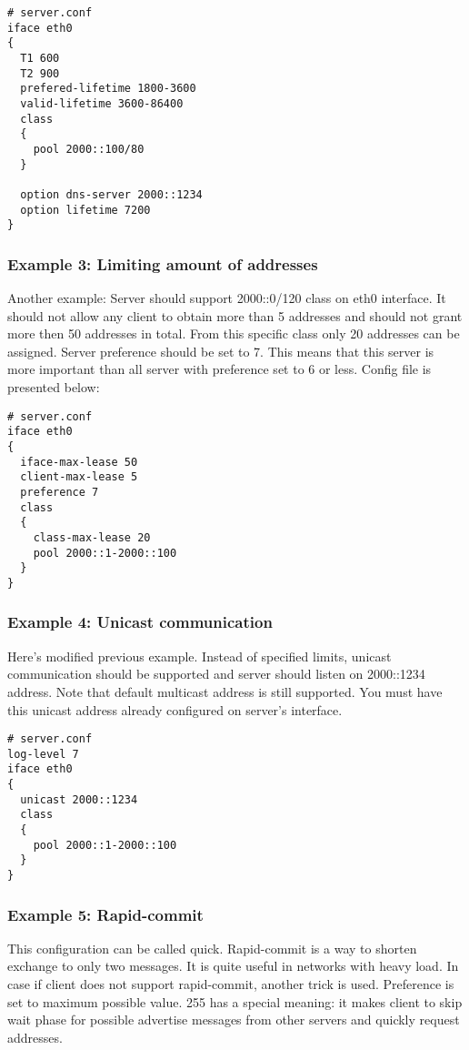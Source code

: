 \begin{lstlisting}
# server.conf
iface eth0
{
  T1 600
  T2 900
  prefered-lifetime 1800-3600
  valid-lifetime 3600-86400
  class
  {
    pool 2000::100/80
  }

  option dns-server 2000::1234
  option lifetime 7200
}
\end{lstlisting}

\subsubsection{Example 3: Limiting amount of addresses}
Another example: Server should support 2000::0/120 class on eth0
interface. It should not allow any client to obtain more than 5
addresses and should not grant more then 50 addresses in total. From
this specific class only 20 addresses can be assigned. Server
preference should be set to 7. This means that this server is more
important than all server with preference set to 6 or less.
Config file is presented below:

\begin{lstlisting}
# server.conf
iface eth0
{
  iface-max-lease 50
  client-max-lease 5
  preference 7
  class
  {
    class-max-lease 20
    pool 2000::1-2000::100
  }
}
\end{lstlisting}

\subsubsection{Example 4: Unicast communication}
\label{example-server-unicast}

Here's modified previous example. Instead of specified limits, unicast
communication should be supported and server should listen on
2000::1234 address. Note that default multicast address is still
supported. You must have this unicast address already configured on
server's interface.

\begin{lstlisting}
# server.conf
log-level 7
iface eth0
{
  unicast 2000::1234
  class
  {
    pool 2000::1-2000::100
  }
}
\end{lstlisting}

\subsubsection{Example 5: Rapid-commit}
This configuration can be called quick. Rapid-commit is a way to shorten exchange to only two messages. It is
quite useful in networks with heavy load. In case if client does not
support rapid-commit, another trick is used. Preference is set to
maximum possible value. 255 has a special meaning: it makes client to
skip wait phase for possible advertise messages from other servers and
quickly request addresses.

